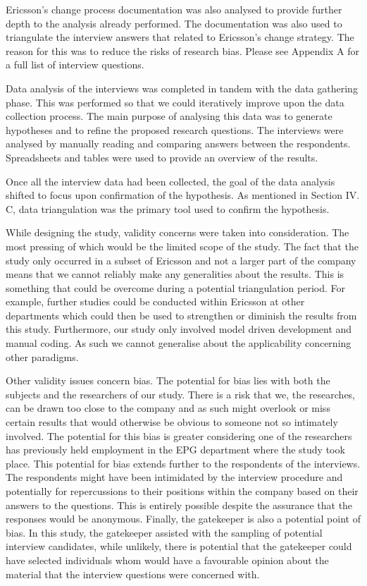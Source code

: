 \documentclass[10pt,twocolumn]{article}
\begin{document}
Ericsson's change process documentation was also analysed to provide further depth to the analysis already performed. The documentation was also used to triangulate the interview answers that related to Ericsson's change strategy. The reason for this was to reduce the risks of research bias. Please see Appendix A for a full list of interview questions.

Data analysis of the interviews was completed in tandem with the data gathering phase. This was performed so that we could iteratively improve upon the data collection process. The main purpose of analysing this data was to generate hypotheses and to refine the proposed research questions. The interviews were analysed by manually reading and comparing answers between the respondents. Spreadsheets and tables were used to provide an overview of the results.

Once all the interview data had been collected, the goal of the data analysis shifted to focus upon confirmation of the hypothesis. As mentioned in Section IV. C, data triangulation was the primary tool used to confirm the hypothesis. 


While designing the study, validity concerns were taken into consideration. The most pressing of which would be the limited scope of the study. The fact that the study only occurred in a subset of Ericsson and not a larger part of the company means that we cannot reliably make any generalities about the results. This is something that could be overcome during a potential triangulation period. For example, further studies could be conducted within Ericsson at other departments which could then be used to strengthen or diminish the results from this study. Furthermore, our study only involved model driven development and manual coding. As such we cannot generalise about the applicability concerning other paradigms.

Other validity issues concern bias. The potential for bias lies with both the subjects and the researchers of our study. There is a risk that we, the researches, can be drawn too close to the company and as such might overlook or miss certain results that would otherwise be obvious to someone not so intimately involved. The potential for this bias is greater considering one of the researchers has previously held employment in the EPG department where the study took place. This potential for bias extends further to the respondents of the interviews. The respondents might have been intimidated by the interview procedure and potentially for repercussions to their positions within the company based on their answers to the questions. This is entirely possible despite the assurance that the responses would be anonymous. Finally, the gatekeeper is also a potential point of bias. In this study, the gatekeeper assisted with the sampling of potential interview candidates, while unlikely, there is potential that the gatekeeper could have selected individuals whom would have a favourable opinion about the material that the interview questions were concerned with.
\end{document}
